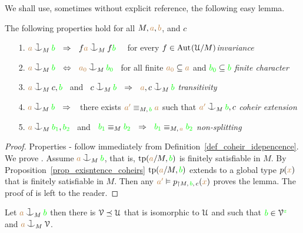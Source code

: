 We shall use, sometimes without explicit reference, the following easy lemma.

\begin{lemma}\label{lem_coheir_independence}
    The following properties hold for all $M,{\color{brown} a},{\color{brown} b}$, and $c$
    \begin{itemize}
    \item[1.] ${\mr a}\cnonfork_M{\gr b}\ \ \IMP\ \ f{\mr a}\cnonfork_Mf{\gr b}$ \ \ 
              for every $f\in{\rm Aut\kern.15ex}(\EuScript U/M)$\hfill \textit{invariance}
    \item[2.] ${\mr a}\cnonfork_M{\gr b}\ \ \IFF\ \ {\mr a_0}\cnonfork_M{\gr b_0}$
              \ for all finite ${\color{brown} a_0}\subseteq{\color{brown}a}$ and 
              ${\color{green} b_0}\subseteq{\color{green}b}$ \hfill\textit{finite character}
    \item[3.] ${\mr a}\cnonfork_Mc,{\gr b}$ \ and \ 
              $c\cnonfork_M{\gr b}\ \ \IMP\ \ {\mr a},c\cnonfork_M{\gr b}$
              \hfill\hfill\hfill\textit{transitivity}
    \item[4.] ${\mr a}\cnonfork_M{\gr b}\ \ \IMP\ \ $ 
              there exists ${\color{brown} a'}\equiv_{M,\,{\color{green} b}}{\color{brown} a}$ such that 
              ${\mr a'}\cnonfork_M{\gr b},c$
              \textit{coheir extension}
    \item[5.] ${\mr a}\cnonfork_M{\gr b_1},{\gr b_2}$ \ and \ 
    ${\color{green} b_1}\equiv_M{\color{green} b_2}\ \ \Rightarrow\ \ {\color{green} b_1}\equiv_{M,\,{\color{brown} a}}{\color{green} b_2}$
              \hspace{\stretch{20}}\textit{non-splitting}
    \end{itemize}
    \end{lemma}
\begin{proof}

Properties - follow immediately from Definition~\ref{def_coheir_idepencence}.
We prove .
Assume ${\mr a}\cnonfork_M{\gr b}$, that is,  ${\rm tp}({\color{brown} a}/M,{\color{green} b})$ is finitely satisfiable in $M$.
By Proposition~\ref{prop_exisntence_coheirs} ${\rm tp}({\color{brown} a}/M,{\color{green} b})$ extends to a global type $p({\color{brown} x})$ that is finitely satisfiable in $M$.
Then any ${\color{brown} a'}\vDash p_{\restriction M,\,{\color{green} b},\,c}({\color{brown} x})$ proves the lemma.
The proof of \ssf{5} is left to the reader.
\end{proof}

\begin{proposition}\label{prop_saturate_heir}
  Let ${\mr a}\cnonfork_M{\gr b}$ then there is $\EuScript V\preceq\EuScript U$ that is isomorphic to $\EuScript U$ and such that ${\color{green} b}\in\EuScript V^{\color{green} z}$ and ${\mr a}\cnonfork_M\V$.
\end{proposition}

